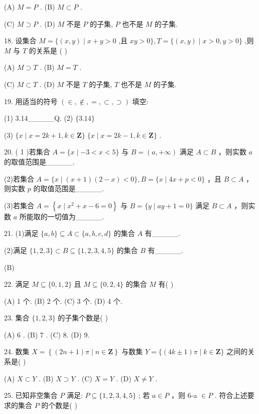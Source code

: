 \documentclass[10pt]{article}
\newcommand*\circled[1]{\tikz[baseline=(char.base)]{\node[shape=circle,draw,inner sep=1.5pt] (char) {\small #1};}}
\begin{document}
(A) \(M = P\) . (B) \(M \subset  P\) .

(C) \(M \supset  P\) . (D) \(M\) 不是 \(P\) 的子集, \(P\) 也不是 \(M\) 的子集.

18. 设集合 \(M = \{ \left( {x,y}\right)  \mid  x + y > 0\) ,且 \({xy} > 0\} ,T = \{ \left( {x,y}\right)  \mid  x > 0,y > 0\}\) ,则 \(M\) 与 \(T\) 的关系是 ( )

(A) \(M \supset  T\) . (B) \(M = T\) .

(C) \(M \subset  T\) . (D) \(M\) 不是 \(T\) 的子集, \(T\) 也不是 \(M\) 的子集.

19. 用适当的符号 \(\left( { \in  , \notin  , = , \subset  , \supset  }\right)\) 填空:

(1) 3.14\_\_\_\_\_Q. (2) \(\{ {3.14}\}\)

(3) \(\{ x \mid  x = {{2k} + 1},k \in  \mathbf{Z}\} \;\{ x \mid  x = {{2k} - 1},k \in  \mathbf{Z}\}\) .

20. ( 1 )若集合 \(A = \{ x \mid   - 3 < x < 5\}\) 与 \(B = \left( {a, + \infty }\right)\) 满足 \(A \subset  B\) ，则实数 \(a\) 的取值范围是\_\_\_\_\_.

(2)若集合 \(A = \{ x \mid  \left( {x + 1}\right) \left( {2 - x}\right)  < 0\} ,B = \{ x \mid  {4x} + p < 0\}\) ，且 \(B \subset  A\) ，则实数 \(p\) 的取值范围是\_\_\_\_\_.

(3)若集合 \(A = \left\{  {x \mid  {x}^{2} + x - 6 = 0}\right\}\) 与 \(B = \{ y \mid  {ay} + 1 = 0\}\) 满足 \(B \subset  A\) ，则实数 \(a\) 所能取的一切值为\_\_\_\_\_.

21. (1)满足 \(\{ a,b\}  \subseteq  A \subset  \{ a,b,c,d\}\) 的集合 \(A\) 有\_\_\_\_\_.

(2)满足 \(\{ 1,2,3\}  \subset  B \subseteq  \{ 1,2,3,4,5\}\) 的集合 \(B\) 有\_\_\_\_\_.

(B)

22. 满足 \(M \subseteq  \{ 0,1,2\}\) 且 \(M \subseteq  \{ 0,2,4\}\) 的集合 \(M\) 有(   )

(A) 1 个. (B) 2 个. (C) 3 个. (D) 4 个.

23. 集合 \(\{ 1,2,3\}\) 的子集个数是( )

(A) 6 . (B) 7 . (C) 8. (D) 9.

24. 数集 \(X = \left\{  {\left( {{2n} + 1}\right) \pi  \mid  n \in  \mathbf{Z}}\right\}\) 与数集 \(Y = \{ \left( {{4k} \pm  1}\right) \pi  \mid  k \in  \mathbf{Z}\}\) 之间的关系是( )

(A) \(X \subset  Y\) . (B) \(X \supset  Y\) . (C) \(X = Y\) . (D) \(X \neq  Y\) .

25. 已知非空集合 \(P\) 满足:  \circled{1}  \(P \subseteq  \{ 1,2,3,4,5\}\) ;  \circled{2} 若 \(a \in  P\) ，则 6-a \(\in  P\) . 符合上述要求的集合 \(P\) 的个数是( )
\end{document}
